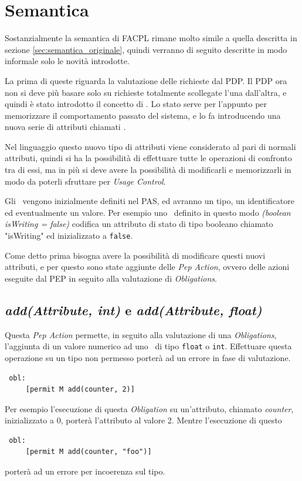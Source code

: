 \section{Semantica} %
\label{sec:semantica}
Sostanzialmente la semantica di FACPL rimane molto simile a quella descritta in sezione \ref{sec:semantica_originale}, quindi verranno di seguito descritte in modo informale solo le novità introdotte.\\ \par
La prima di queste riguarda la valutazione delle richieste dal PDP. Il PDP ora non si deve più basare solo su richieste totalmente scollegate l'una dall'altra, e quindi è stato introdotto il concetto di \status.
Lo stato serve per l'appunto per memorizzare il comportamento passato del sistema, e lo fa introducendo una nuova serie di attributi chiamati \statusattribute.\\ \par
Nel linguaggio questo nuovo tipo di attributi viene considerato al pari di normali attributi, quindi si ha la possibilità di effettuare tutte le operazioni di confronto tra di essi, ma in più si deve avere la possibilità di modificarli e memorizzarli in modo da poterli sfruttare per \textit{Usage Control}.\\ \par
Gli \statusattribute \ vengono inizialmente definiti nel PAS, ed avranno un tipo, un identificatore ed eventualmente un valore. Per esempio uno \statusattribute \ definito in questo modo \textit{(boolean isWriting = false)} codifica un attributo di stato di tipo booleano chiamato "isWriting" ed inizializzato a \texttt{false}.\\ \par
Come detto prima bisogna avere la possibilità di modificare questi nuovi attributi, e per questo sono state aggiunte delle \textit{Pep Action}, ovvero delle azioni eseguite dal PEP in seguito alla valutazione di \textit{Obligations}.
\subsection*{\textit{add(Attribute, int)} e \textit{add(Attribute, float)}} %
\label{ssub:opadd}
 Questa \textit{Pep Action} permette, in seguito alla valutazione di una \textit{Obligations}, l'aggiunta di un valore numerico ad uno \statusattribute \ di tipo \texttt{float} o \texttt{int}. Effettuare questa operazione su un tipo non permesso porterà ad un errore in fase di valutazione.
\begin{verbatim}
 obl:
     [permit M add(counter, 2)]
\end{verbatim}
Per esempio l'esecuzione di questa \textit{Obligation} su un'attributo, chiamato \textit{counter}, inizializzato a $0$, porterà l'attributo al valore 2.
Mentre l'esecuzione di questo
\begin{verbatim}
 obl:
     [permit M add(counter, "foo")]
\end{verbatim}
porterà ad un errore per incoerenza sul tipo.
